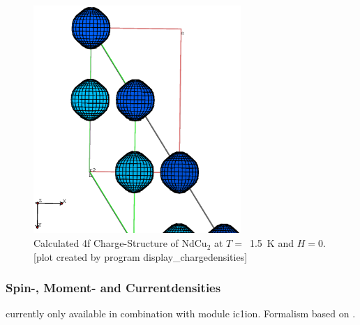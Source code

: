 \begin{figure}[hb]%
\begin{center}\leavevmode
\includegraphics[angle=0, width=0.7\textwidth]{figsrc/ndcu2b/resultss/chargesab.eps}
\end{center}
\caption{Calculated 4f Charge-Structure of NdCu$_2$ at $T=$~1.5~K and $H=0$.
[plot created by program {\prg display\_chargedensities}]}
\label{chargegraphic}
\end{figure}

\subsubsection{Spin-, Moment- and Currentdensities}

currently only available in combination with module {\prg ic1ion}.
Formalism based on \cite{balcar75-1581,balcar89-1}.

